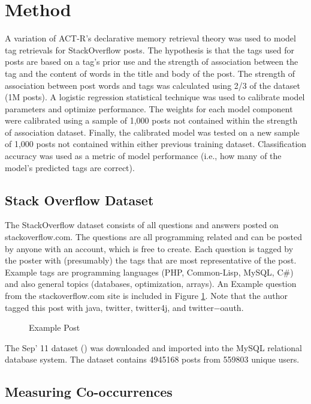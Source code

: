 \documentclass[10pt,letterpaper]{article}
\begin{document}
\section{Method}

A variation of ACT-R's declarative memory retrieval theory was used to model tag retrievals for StackOverflow posts.
The hypothesis is that the tags used for posts are based on a tag's prior use and the strength of association between the tag and the content of words in the title and body of the post.
The strength of association between post words and tags was calculated using 2/3 of the dataset (1M posts).
A logistic regression statistical technique was used to calibrate model parameters and optimize performance.
The weights for each model component were calibrated using a sample of 1,000 posts not contained within the strength of association dataset.
Finally, the calibrated model was tested on a new sample of 1,000 posts not contained within either previous training dataset.
Classification accuracy was used as a metric of model performance (i.e., how many of the model's predicted tags are correct).

\subsection{Stack Overflow Dataset}

The StackOverflow dataset consists of all questions and answers posted on stackoverflow.com.
The questions are all programming related and can be posted by anyone with an account, which is free to create.
Each question is tagged by the poster with (presumably) the tags that are most representative of the post.
Example tags are programming languages (PHP, Common-Lisp, MySQL, C\#) and also general topics (databases, optimization, arrays).
An Example question from the stackoverflow.com site is included in Figure \ref{fig:examplePost}.
Note that the author tagged this post with java, twitter, twitter4j, and twitter−oauth.

\begin{figure}[ht]
  \centering
  \caption{Example Post}
  \label{fig:examplePost}
\end{figure}


The Sep' 11 dataset (\cite{DataDump2011}) was downloaded and imported into the MySQL relational database system.
The dataset contains \num{4945168} posts from \num{559803} unique users.

\subsection{Measuring Co-occurrences}
\end{document}
